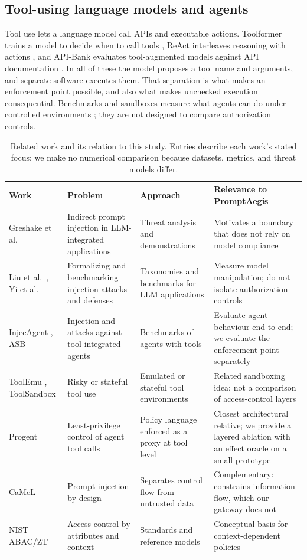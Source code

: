 \documentclass[3p,twocolumn]{elsarticle}
\begin{document}
\subsection{Tool-using language models and agents}
Tool use lets a language model call APIs and executable actions. Toolformer trains a model to decide when to call tools \cite{toolformer2023}, ReAct interleaves reasoning with actions \cite{react2023}, and API-Bank evaluates tool-augmented models against API documentation \cite{apibank2023}. In all of these the model proposes a tool name and arguments, and separate software executes them. That separation is what makes an enforcement point possible, and also what makes unchecked execution consequential. Benchmarks and sandboxes measure what agents can do under controlled environments \cite{agentbench2023,toolemu2023,toolsandbox2024}; they are not designed to compare authorization controls.

\begin{table}[!t]
\centering
\caption{Related work and its relation to this study. Entries describe each work's stated focus; we make no numerical comparison because datasets, metrics, and threat models differ.}
\label{tab:related}
\footnotesize
\setlength{\tabcolsep}{4pt}
\begin{tabular}{p{2.4cm}p{3.3cm}p{4.2cm}p{5.0cm}}
\toprule
Work & Problem & Approach & Relevance to PromptAegis \\
\midrule
Greshake et al.\ \cite{greshake2023} & Indirect prompt injection in LLM-integrated applications & Threat analysis and demonstrations & Motivates a boundary that does not rely on model compliance \\
Liu et al.\ \cite{formalpi2023}, Yi et al.\ \cite{bipia2023} & Formalizing and benchmarking injection attacks and defenses & Taxonomies and benchmarks for LLM applications & Measure model manipulation; do not isolate authorization controls \\
InjecAgent \cite{injecagent2024}, ASB \cite{asb2024} & Injection and attacks against tool-integrated agents & Benchmarks of agents with tools & Evaluate agent behaviour end to end; we evaluate the enforcement point separately \\
ToolEmu \cite{toolemu2023}, ToolSandbox \cite{toolsandbox2024} & Risky or stateful tool use & Emulated or stateful tool environments & Related sandboxing idea; not a comparison of access-control layers \\
Progent \cite{progent2025} & Least-privilege control of agent tool calls & Policy language enforced as a proxy at tool level & Closest architectural relative; we provide a layered ablation with an effect oracle on a small prototype \\
CaMeL \cite{camel2025} & Prompt injection by design & Separates control flow from untrusted data & Complementary: constrains information flow, which our gateway does not \\
NIST ABAC/ZT \cite{nistabac2019,nistzt2020} & Access control by attributes and context & Standards and reference models & Conceptual basis for context-dependent policies \\
\bottomrule
\end{tabular}
\end{table}
\end{document}
